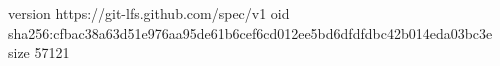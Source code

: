 version https://git-lfs.github.com/spec/v1
oid sha256:cfbac38a63d51e976aa95de61b6cef6cd012ee5bd6dfdfdbc42b014eda03bc3e
size 57121
